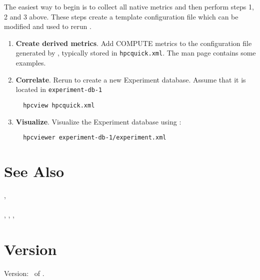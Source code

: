 \documentclass[english]{article}
\begin{document}
The easiest way to begin is to collect all native metrics and then perform steps 1, 2 and 3 above.
These steps create a template  configuration file which can be modified and used to rerun .

\begin{enumerate}
\item \textbf{Create derived metrics}.  Add COMPUTE metrics to the  configuration file generated by , typically stored in \texttt{hpcquick.xml}.  The  man page contains some examples. 

\item \textbf{Correlate}. Rerun  to create a new Experiment database.  Assume that it is located in \texttt{experiment-db-1}
\begin{verbatim}
  hpcview hpcquick.xml
\end{verbatim}

\item \textbf{Visualize}.
Visualize the Experiment database using :
\begin{verbatim}
  hpcviewer experiment-db-1/experiment.xml
\end{verbatim}

\end{enumerate}



\section{See Also}

,  \\
 \\
, , ,  \\ %

\section{Version}

Version: \Version\ of \Date.
\end{document}
